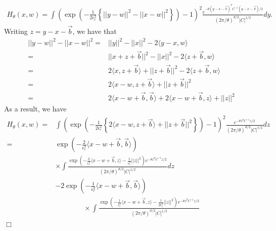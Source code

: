 \documentclass[12pt]{article}
\newenvironment {proof}{{\noindent\bf Proof }}{\hfill $\Box$ \medskip}
\newcommand{\meanq}{\vec b}    %
\newcommand{\covq}{C}     %
\begin{document}
\begin{proof}
\begin{align}
H_\theta(x, w)
=
\int
    \left(
        \exp\left(
            - \frac{1}{2\epsilon_r^2}
            \left\{
                ||y - w||^2 - ||x - w||^2
            \right\}
        \right)
        -
        1
    \right)^2
    \frac{
        e^{-\theta (y - x-\meanq)^{T}\covq^{-1}(y - x-\meanq)  / 2}
    }{
        (2 \pi/ \theta)^{d/2} |\covq|^{1/2}
    }
dy.
\end{align}
Writing $z=y-x-\meanq$, we have that 
\begin{equation}
\begin{aligned}
||y - w||^2 - ||x - w||^2 
=& ||y||^2-||x||^2 -2\langle y-x, w\rangle \\
=&||x+z+ \meanq||^2-||x||^2-2 \langle z+ \meanq, w\rangle\\
=&2\langle x, z+ \meanq \rangle + ||z+ \meanq||^2-2 \langle z+ \meanq, w\rangle \\
=& 2 \langle x-w, z+ \meanq \rangle + ||z+ \meanq||^2\\
=& 2\langle x-w+ \meanq,\meanq \rangle + 2\langle x-w+ \meanq, z \rangle +||z||^2
\end{aligned}
\end{equation}
As a result, we have 
\begin{align}
H_\theta(x, w)
=&
\int
    \left(
        \exp\left(
            - \frac{1}{2\epsilon_r^2}
            \left\{
                2 \langle x-w, z+ \meanq \rangle + ||z+ \meanq||^2
            \right\}
        \right)
        -
        1
    \right)^2
    \frac{
        e^{-\theta z^{T}\covq^{-1}z  / 2}
    }{
        (2 \pi/ \theta)^{d/2} |\covq|^{1/2}
    }
dz\\
=&\exp\left(-\frac{2}{\epsilon_r^2}\langle x-w+ \meanq,\meanq \rangle \right)\\
& \times \int
        \frac{
        \exp\left(
            - \frac{2}{\epsilon_r^2} \langle x-w+ \meanq, z \rangle
            - \frac{1}{\epsilon_r^2} ||z||^2
            \right)
            e^{-\theta z^{T}\covq^{-1}z  / 2}
    }{
        (2 \pi/ \theta)^{d/2} |\covq|^{1/2}
    }
dz\\ \label{eq: Second moment term matrix calculation}
&-2\exp\left(-\frac{1}{\epsilon_r^2}\langle x-w+ \meanq,\meanq \rangle \right)\\
& \qquad \qquad \times     \int
    \frac{ \exp\left(
             -\frac{1}{\epsilon_r^2}\langle x-w+ \meanq, z \rangle
              -\frac{1}{2\epsilon_r^2} ||z||^2
            \right)e^{-\theta z^{T}\covq^{-1}z  / 2}
        }{
        (2 \pi/ \theta)^{d/2} |\covq|^{1/2} \label{eq: first moment term matrix calculation}
}
\end{align}
\end{proof}
\end{document}
